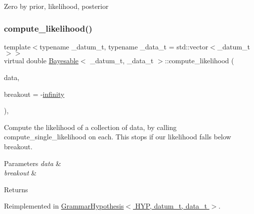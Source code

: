 Zero by prior, likelihood, posterior\mbox{\label{class_bayesable_a202493156cec15937bee304d807fdbdb}} 
\subsubsection{\texorpdfstring{compute\+\_\+likelihood()}{compute\_likelihood()}}
{\footnotesize\ttfamily template$<$typename \+\_\+datum\+\_\+t, typename \+\_\+data\+\_\+t = std\+::vector$<$\+\_\+datum\+\_\+t$>$$>$ \\
virtual double \hyperlink{class_bayesable}{Bayesable}$<$ \+\_\+datum\+\_\+t, \+\_\+data\+\_\+t $>$\+::compute\+\_\+likelihood (\begin{DoxyParamCaption}\item[{const \hyperlink{class_bayesable_aa2788c4d7718c0a824e1d28c4c98f921}{data\+\_\+t} \&}]{data,  }\item[{const double}]{breakout = {\ttfamily -\/\hyperlink{_numerics_8h_a1bb1e42ae1b40cad6e99da0aab8a5576}{infinity}} }\end{DoxyParamCaption})\hspace{0.3cm}{\ttfamily [inline]}, {\ttfamily [virtual]}}



Compute the likelihood of a collection of data, by calling compute\+\_\+single\+\_\+likelihood on each. This stops if our likelihood falls below breakout. 


\begin{DoxyParams}{Parameters}
{\em data} & \\
\hline
{\em breakout} & \\
\hline
\end{DoxyParams}
\begin{DoxyReturn}{Returns}

\end{DoxyReturn}


Reimplemented in \hyperlink{class_grammar_hypothesis_a35008279d3455087b7ea541f3259becb}{Grammar\+Hypothesis$<$ H\+Y\+P, datum\+\_\+t, data\+\_\+t $>$}.

\mbox{\label{class_bayesable_a0b0552923602bcab6c768581ab8c7df8}} 
